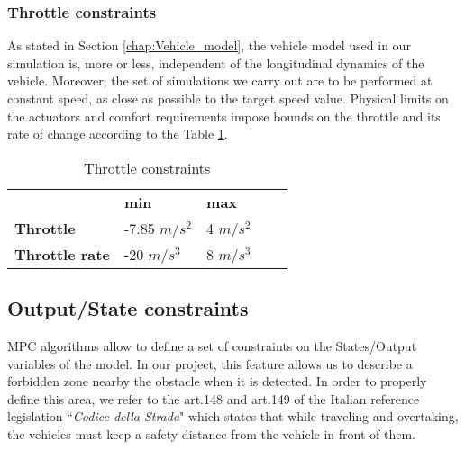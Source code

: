 \subsubsection{Throttle constraints}
As stated in Section \ref{chap:Vehicle_model}, the vehicle model used in our simulation is,  more or less, independent of the longitudinal dynamics of the vehicle. Moreover, the set of simulations we carry out are to be performed at constant speed, as close as possible to the target speed value. 
Physical limits on the actuators and comfort requirements impose bounds on the throttle and its rate of change according to the Table \ref{tab:throttle}.

\begin{table}[H]
\begin{center}
\begin{tabular}{lllll}
\cline{2-3}
\multicolumn{1}{l|}{} & \multicolumn{1}{l|}{\textbf{min}} & \multicolumn{1}{l|}{\textbf{max}} &  &  \\ \cline{1-3}
\multicolumn{1}{|l|}{\textbf{Throttle}} & \multicolumn{1}{l|}{-7.85 $m/s^2$}  & \multicolumn{1}{l|}{4 $m/s^2$} &  &  \\ \cline{1-3}
\multicolumn{1}{|l|}{\textbf{Throttle rate}} & \multicolumn{1}{l|}{-20 $m/s^3$}    & \multicolumn{1}{l|}{8 $m/s^3$} &  &  \\ \cline{1-3}
\end{tabular}
\caption{Throttle constraints}
\label{tab:throttle}
\end{center}
\end{table}

\subsection{Output/State constraints}
MPC algorithms allow to define a set of constraints on the States/Output variables of the model. In our project, this feature allows us to describe a forbidden zone nearby the obstacle when it is detected. In order to properly define this area, we refer to the art.148 and art.149 of the Italian reference legislation ``\textit{Codice della Strada}" which states that while traveling and overtaking, the vehicles must keep a safety distance from the vehicle in front of them.


